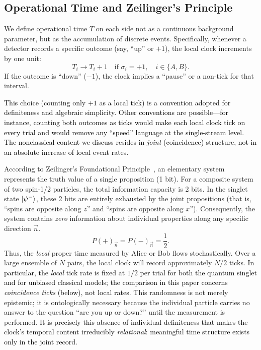 \documentclass[reprint,aps,pra,longbibliography]{revtex4-2}
\newcommand{\rev}[1]{\textcolor{black}{#1}} %
\newcommand{\revA}[1]{\textcolor{black}{#1}} %
\begin{document}
\subsection{Operational Time and Zeilinger's Principle}

We define operational time $T$ on each side not as a continuous background parameter, but as the accumulation of discrete events. Specifically, whenever a detector records a specific outcome (say, ``up'' or $+1$), the local clock increments by one unit:
\begin{equation}
T_i \to T_i + 1 \quad \text{if } \sigma_i = +1, \quad i \in \{A, B\}.
\end{equation}
If the outcome is ``down'' ($-1$), the clock implies a ``pause'' or a non-tick for that interval.

\rev{This choice (counting only $+1$ as a local tick) is a convention adopted for definiteness and algebraic simplicity. Other conventions are possible---for instance, counting both outcomes as ticks would make each local clock tick on every trial and would remove any ``speed'' language at the single-stream level. The nonclassical content we discuss resides in \emph{joint} (coincidence) structure, not in an absolute increase of local event rates.}

According to Zeilinger's Foundational Principle~\cite{zeil-99}, an elementary system represents the truth value of a single proposition (1 bit). For a composite system of two spin-1/2 particles, the total information capacity is 2 bits. In the singlet state $\ket{\psi^-}$, these 2 bits are entirely exhausted by the joint propositions (that is, ``spins are opposite along $z$'' and ``spins are opposite along $x$''). Consequently, the system contains \emph{zero} information about individual properties along any specific direction $\vec{n}$.
\begin{equation}
P(+)_{\vec{n}} = P(-)_{\vec{n}} = \frac{1}{2}.
\end{equation}
Thus, the \emph{local} proper time measured by Alice or Bob flows stochastically. Over a large ensemble of $N$ pairs, the local clock will record approximately $N/2$ ticks. \rev{In particular, the \emph{local} tick rate is fixed at $1/2$ per trial for both the quantum singlet and for unbiased classical models; the comparison in this paper concerns \emph{coincidence ticks} (below), not local rates.} This randomness is not merely epistemic; it is ontologically necessary because the individual particle carries no answer to the question ``are you up or down?'' until the measurement is performed. \revA{It is precisely this absence of individual definiteness that makes the clock's temporal content irreducibly \emph{relational}: meaningful time structure exists only in the joint record.}
\end{document}
